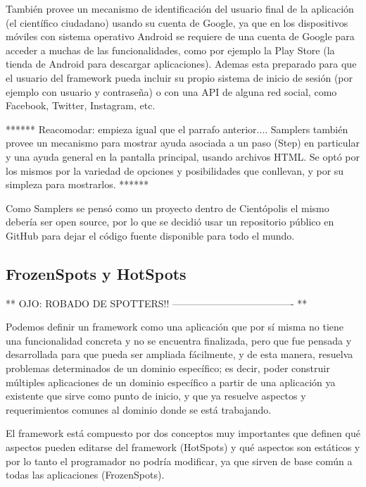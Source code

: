 También provee un mecanismo de identificación del usuario final de la aplicación (el científico ciudadano) usando su cuenta de Google, ya que en los dispositivos móviles con sistema operativo Android se requiere de una cuenta de Google para acceder a muchas de las funcionalidades, como por ejemplo la Play Store (la tienda de Android para descargar aplicaciones).  Ademas esta preparado para que el usuario del framework pueda incluir su propio sistema de inicio de sesión (por ejemplo con usuario y contraseña) o con una API de alguna red social, como Facebook, Twitter, Instagram, etc.



****** Reacomodar: empieza igual que el parrafo anterior....
Samplers también provee un mecanismo para mostrar ayuda asociada a un paso (Step) en particular y una ayuda general en la pantalla principal, usando archivos HTML. Se optó por los mismos por la variedad de opciones y posibilidades que conllevan, y por su simpleza para mostrarlos.
******



Como Samplers se pensó como un proyecto dentro de Cientópolis\cite{cientopolis} el mismo debería ser open source, por lo que se decidió usar un repositorio público en GitHub\cite{github} para dejar el código fuente disponible para todo el mundo.




\subsection{FrozenSpots y HotSpots}
** OJO: ROBADO DE SPOTTERS!! ------------------------------------- **

Podemos definir un framework como una aplicación que por sí misma no tiene una funcionalidad concreta y no se encuentra finalizada, pero que fue pensada y desarrollada para que pueda ser ampliada fácilmente, y de esta manera, resuelva problemas determinados de un dominio específico; es decir, poder construir múltiples aplicaciones de un dominio específico a partir de una aplicación ya existente que sirve como punto de inicio, y que ya resuelve aspectos y requerimientos comunes al dominio donde se está trabajando.

El framework está compuesto por dos conceptos muy importantes que definen qué aspectos pueden editarse del framework (HotSpots) y qué aspectos son estáticos y por lo tanto el programador no podría modificar, ya que sirven de base común a todas las aplicaciones (FrozenSpots).

